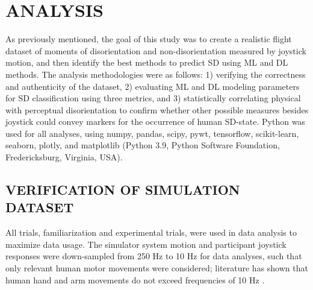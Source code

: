 \documentclass{ieeeaccess}
\begin{document}
\section{ANALYSIS}
As previously mentioned, the goal of this study was to create a realistic flight dataset of moments of disorientation and non-disorientation measured by joystick motion, and then identify the best methods to predict SD using ML and DL methods. The analysis methodologies were as follows: 1) verifying the correctness and authenticity of the dataset, 2) evaluating ML and DL modeling parameters for SD classification using three metrics, and 3) statistically correlating physical with perceptual disorientation to confirm whether other possible measures besides joystick could convey markers for the occurrence of human SD-state. Python was used for all analyses, using numpy, pandas, scipy, pywt, tensorflow, scikit-learn, seaborn, plotly, and matplotlib (Python 3.9, Python Software Foundation, Fredericksburg, Virginia, USA).

\subsection{VERIFICATION OF SIMULATION DATASET}
\label{VERIFICATION_OF_SIMULATION_DATASET}
All trials, familiarization and experimental trials, were used in data analysis to maximize data usage. The simulator system motion and participant joystick responses were down-sampled from 250 Hz to 10 Hz for data analyses, such that only relevant human motor movements were considered; literature has shown that human hand and arm movements do not exceed frequencies of 10 Hz \cite{Shadmehr_2004_Computational}.
\end{document}
